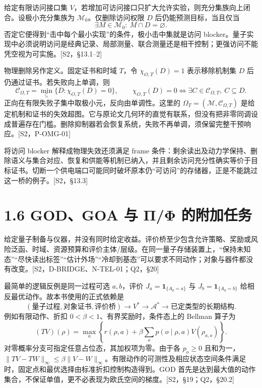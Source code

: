 \documentclass[
  11pt,
  oneside]{book}
\begin{document}
给定有限访问接口集
\(V\)，若增加可访问接口只扩大允许实验，则充分集族向上闭合。设极小充分集族为
\(\mathcal M_0\)。仅删除访问权限 \(D\) 后仍能预测目标，当且仅当 \[
\exists M\in\mathcal M_0:\ M\cap D=\varnothing.
\] 否定它便得到``击中每个最小实现''的条件，极小击中集就是访问
blocker。量子实现中必须说明访问是经典记录、局部测量、联合测量还是相干控制；更强访问不能凭空视为可实施。{[}S2，§13.1--2{]}

物理删除另作定义。固定证书和时域 \(T\)，令 \(\chi_{O,T}(D)=1\)
表示移除机制集 \(D\) 后仍通过证书。若失败向上单调，则 \[
\mathcal C_{\Omega,T}=\min_{\subseteq}\{D:\chi_{O,T}(D)=0\},\qquad
\chi_{O,T}(D)=0\iff\exists C\in\mathcal C_{\Omega,T},\ C\subseteq D.
\] 正向在有限失败子集中取极小元，反向由单调性。这里的
\(\Omega_T=(\mathcal M,\mathcal C_{\Omega,T})\)
是给定机制和证书的失效超图。它与原论文几何环的直觉有联系，但没有把非零同调设成普遍存在门槛。删除抑制器若会恢复系统，失败不再单调，须保留完整干预响应。{[}S2，P-OMG-01{]}

将访问 blocker 解释成物理失效还须满足 frame
条件：剩余读出及动力学保持、删除语义与集合对应、恢复和供能等机制已纳入，并且剩余访问充分性确实等价于目标证书。切断一个供电端口可能同时破坏原本仍``可访问''的存储器，正是不能跳过这一桥的例子。{[}S2，§13.3{]}

\hypertarget{godgoa-ux4e0e-ux3c0ux3c6-ux7684ux9644ux52a0ux4efbux52a1}{%
\section{1.6 GOD、GOA 与 Π/Φ
的附加任务}\label{godgoa-ux4e0e-ux3c0ux3c6-ux7684ux9644ux52a0ux4efbux52a1}}

给定量子制备与仪器，并没有同时给定收益。评价桥至少包含允许策略、奖励或风险泛函、时域、资源预算和评价主体/层级。在同一量子存储装置上，``保持未知态''``尽快读出标签''``估计外场''``冷却到基态''可以要求不同动作；对象与器件都没有改变。{[}S2，D-BRIDGE、N-TEL-01；Q2，§20{]}

最简单的逻辑反例是同一过程可选 \(a,b\)，评价
\(J_a=\mathbf1_{\{A_0=a\}}\) 与 \(J_b=\mathbf1_{\{A_0=b\}}\)
给相反最优动作。故本书使用的正式依赖是 \[
(\text{量子过程},\text{对象证书},\text{评价桥})
\longrightarrow V^*\longrightarrow\mathcal A^*\longrightarrow\text{已定类型的长期结构}.
\] 例如有限动作、折扣 \(0<\beta<1\)、有界奖励时，条件态上的 Bellman
算子为 \[
(TV)(\rho)=\max_a\left\{r(\rho,a)+\beta\sum_o p(o\mid\rho,a)
V(\rho_{a,o})\right\}.
\] 对零概率分支可指定任意占位态，其加权项为零。由于各 \(p_o\ge0\)
且和为一，\(\|TV-TW\|_\infty\le\beta\|V-W\|_\infty\)。有限动作的可测性及相应状态空间条件满足时，固定点和最优选择由标准折扣控制构造得到。GOD
首先是达到最大值的动作集合，不保证单值，更不必表现为欧氏空间的梯度。{[}S2，§19；Q2，§20.2{]}
\end{document}
